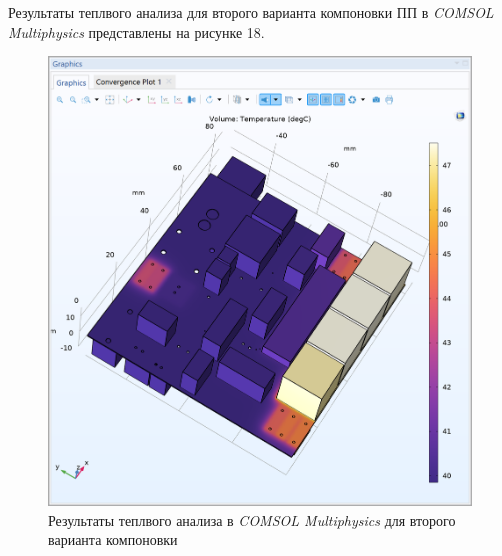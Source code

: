 Результаты теплвого анализа для второго варианта компоновки ПП в
\textit{COMSOL Multiphysics} представлены на рисунке 18.

\begin{figure}[H]
  \centering
  \includegraphics[scale=0.5]{../img/scrot/Screenshot-2024-05-16-023133.png}
  \caption{Результаты теплвого анализа в \textit{COMSOL Multiphysics}
  для второго варианта компоновки}

\end{figure}

